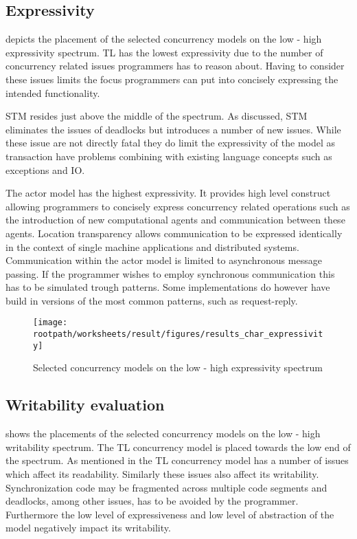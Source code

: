 \subsection{Expressivity}
 depicts the placement of the selected concurrency models on the low - high expressivity spectrum. \ac{TL} has the lowest expressivity due to the number of concurrency related issues programmers has to reason about. Having to consider these issues limits the focus programmers can put into concisely expressing the intended functionality.

\ac{STM} resides just above the middle of the spectrum. As discussed, \ac{STM} eliminates the issues of deadlocks but introduces a number of new issues. While these issue are not directly fatal they do limit the expressivity of the model as transaction have problems combining with existing language concepts such as exceptions and \ac{IO}.

The actor model has the highest expressivity. It provides high level construct allowing programmers to concisely express concurrency related operations such as the introduction of new computational agents and communication between these agents. Location transparency allows communication to be expressed identically in the context of single machine applications and distributed systems. Communication within the actor model is limited to asynchronous message passing. If the programmer wishes to employ synchronous communication this has to be simulated trough patterns. Some implementations do however have build in versions of the most common patterns, such as request-reply.

\begin{figure}[htbp]
\centering
 \texttt{[image: \\rootpath/worksheets/result/figures/results\_char\_expressivity]} 
 \caption{Selected concurrency models on the low - high expressivity spectrum}
\label{fig:results_char_expressivity}
\end{figure}

\subsection{Writability evaluation}
 shows the placements of the selected concurrency models on the low - high writability spectrum. The \ac{TL} concurrency model is placed towards the low end of the spectrum. As mentioned in  the \ac{TL} concurrency model has a number of issues which affect its readability. Similarly these issues also affect its writability. Synchronization code may be fragmented across multiple code segments and deadlocks, among other issues, has to be avoided by the programmer. Furthermore the low level of expressiveness and low level of abstraction of the model negatively impact its writability.

